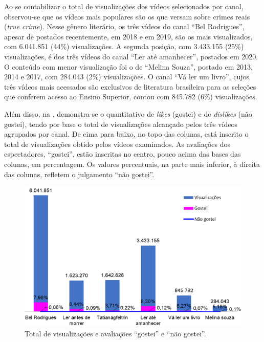 \documentclass[portuguese]{textolivre}
\begin{document}
Ao se contabilizar o total de visualizações dos vídeos selecionados por
canal, observou-se que os vídeos mais populares são os que versam sobre
crimes reais (\emph{true crime}). Nesse gênero literário, os três vídeos
do canal ``Bel Rodrigues'', apesar de postados recentemente, em 2018 e
em 2019, são os mais visualizados, com 6.041.851 (44\%) visualizações. A
segunda posição, com 3.433.155 (25\%) visualizações, é dos três vídeos
do canal ``Ler até amanhecer'', postados em 2020. O conteúdo com menor
visualização foi o de ``Melina Souza'', postado em 2013, 2014 e 2017,
com 284.043 (2\%) visualizações. O canal ``Vá ler um livro'', cujos três
vídeos mais acessados são exclusivos de literatura brasileira para as
seleções que conferem acesso ao Ensino Superior, contou com 845.782
(6\%) visualizações.

Além disso, na , demonstra-se o quantitativo de \emph{likes}
(gostei) e de \emph{dislikes }(não gostei), tendo por base o total de
visualizações alcançado pelos três vídeos agrupados por canal. De cima
para baixo, no topo das colunas, está inscrito o total de visualizações
obtido pelos vídeos examinados. As avaliações dos espectadores,
``gostei'', estão inscritas no centro, pouco acima das bases das
colunas, em percentagem. Os valores percentuais, na parte mais inferior,
à direita das colunas, refletem o julgamento ``não gostei''.

\begin{figure}[h!]
\centering
\begin{minipage}{.75\textwidth}
\includegraphics[width=\textwidth]{figure02.png}  
\caption{Total de visualizações e avaliações “gostei” e “não gostei”.}\label{fig02}
\end{minipage}
\end{figure}
\end{document}
